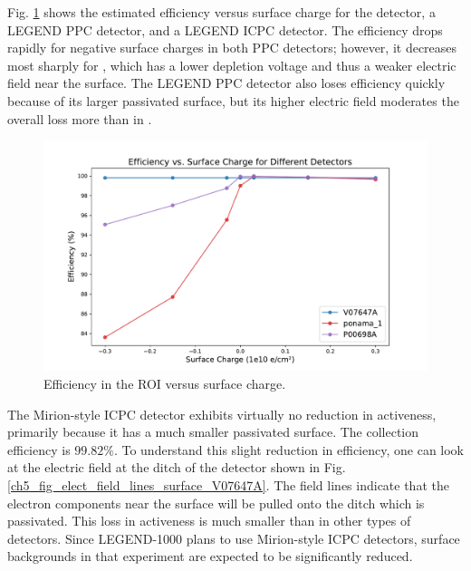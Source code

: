 Fig. \ref{fig:efficiency_sc_plot} shows the estimated efficiency versus surface charge for the {\ponama} detector, a LEGEND PPC detector, and a LEGEND ICPC detector. The efficiency drops rapidly for negative surface charges in both PPC detectors; however, it decreases most sharply for {\ponama}, which has a lower depletion voltage and thus a weaker electric field near the surface. The LEGEND PPC detector also loses efficiency quickly because of its larger passivated surface, but its higher electric field moderates the overall loss more than in {\ponama}.

\begin{figure}%
\includegraphics[trim={1.6cm 0.3cm 2cm 1.8cm},clip,width=\linewidth]{ch5/figs/efficiency_0nbb.pdf}
\caption{Efficiency in the ROI versus surface charge.}
\label{fig:efficiency_sc_plot}
\end{figure}

The Mirion-style ICPC detector exhibits virtually no reduction in activeness, primarily because it has a much smaller passivated surface. The collection efficiency is $99.82\%$. To understand this slight reduction in efficiency, one can look at the electric field at the ditch of the detector shown in Fig. \ref{ch5_fig_elect_field_lines_surface_V07647A}. The field lines indicate that the electron components near the surface will be pulled onto the ditch which is passivated. This loss in activeness is much smaller than in other types of detectors. Since LEGEND-1000 plans to use Mirion-style ICPC detectors, surface backgrounds in that experiment are expected to be significantly reduced.

